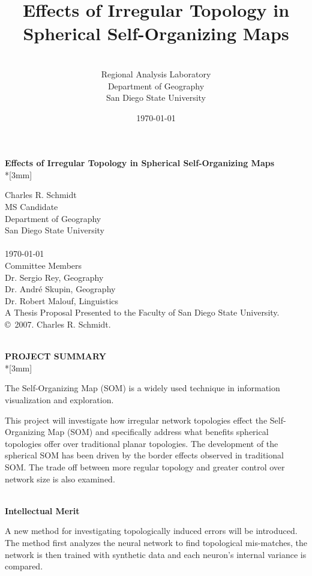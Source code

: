 \documentclass[10pt,titlepage]{article}
\title{Effects of Irregular Topology in Spherical Self-Organizing Maps}
\author{\sc{Charles R. Schmidt}\\Regional Analysis Laboratory\\Department of Geography\\San Diego State University}
\date{\today}
\begin{document}
\break
\begin{center}
{\Large{\bf Effects of Irregular Topology in Spherical Self-Organizing Maps}}\\*[3mm]
\end{center}
Charles R. Schmidt\\
MS Candidate\\
Department of Geography\\
San Diego State University\\\\
\today\\\break
Committee Members\\
Dr. Sergio Rey, Geography\\
Dr. Andr{\'e} Skupin, Geography\\
Dr. Robert Malouf, Linguistics\\\break
A Thesis Proposal Presented to the Faculty of San Diego State University.\\
\copyright~2007. Charles R. Schmidt. \\
%
\\
\tableofcontents
\newpage
%
\doublespacing
\newpage
\begin{center}
{\Large{\bf PROJECT SUMMARY}}\\*[3mm]
\end{center}
The Self-Organizing Map (SOM) is a widely used technique in information
visualization and exploration. 

This project will investigate how irregular network topologies effect the
Self-Organizing Map (SOM) and specifically address what benefits spherical topologies
offer over traditional planar topologies.  The development of the spherical
SOM has been driven by the border effects observed in
traditional SOM. The trade off between more regular topology and greater control
over network size is also examined.

\noindent
\\
{\bf Intellectual Merit}

A new method for investigating topologically induced errors will be introduced.
The method first analyzes the neural network to find topological mis-matches, 
the network is then trained with synthetic data and each neuron's
internal variance is compared.  
\end{document}
